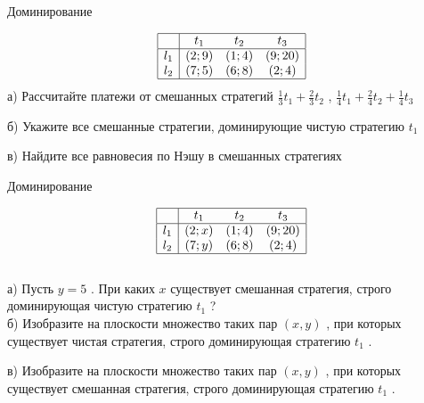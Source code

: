 \begin{problem}
 Доминирование

\[\begin{array}{|c|ccc|}  \hline {} & {t_{1} } & {t_{2} } & {t_{3} } \\  \hline {l_{1} } & {\left(2;9\right)} & {\left(1;4\right)} & {\left(9;20\right)} \\ {l_{2} } & {\left(7;5\right)} & {\left(6;8\right)} & {\left(2;4\right)} \\  \hline  \end{array}\]
а)	Рассчитайте платежи от смешанных стратегий  $\frac{1}{3} t_{1} +\frac{2}{3} t_{2} $ ,  $\frac{1}{4} t_{1} +\frac{2}{4} t_{2} +\frac{1}{4} t_{3} $

б)	Укажите все смешанные стратегии, доминирующие чистую стратегию  $t_{1} $

в)	Найдите все равновесия по Нэшу в смешанных стратегиях



\begin{sol}

\end{sol}
\end{problem}



\begin{problem}
 Доминирование

\[\begin{array}{|c|ccc|}  \hline {} & {t_{1} } & {t_{2} } & {t_{3} } \\  \hline {l_{1} } & {\left(2;x\right)} & {\left(1;4\right)} & {\left(9;20\right)} \\ {l_{2} } & {\left(7;y\right)} & {\left(6;8\right)} & {\left(2;4\right)} \\  \hline  \end{array}\]\\
а)	Пусть  $y=5$ . При каких  $x$  существует смешанная стратегия, строго доминирующая чистую стратегию  $t_{1} $ ?\\
б)	Изобразите на плоскости множество таких пар  $\left(x,y\right)$ , при которых существует чистая стратегия, строго доминирующая стратегию  $t_{1} $ .

в)	Изобразите на плоскости множество таких пар  $\left(x,y\right)$ , при которых существует смешанная стратегия, строго доминирующая стратегию  $t_{1} $ .



\begin{sol}

\end{sol}
\end{problem}



